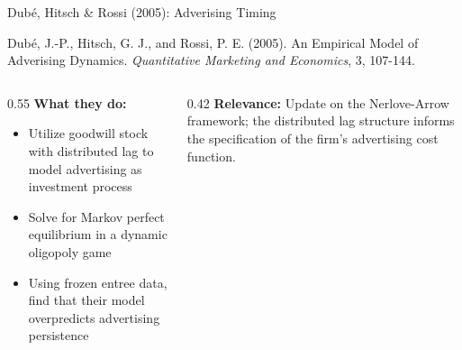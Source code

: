 \documentclass[aspectratio=169,professionalfonts]{beamer}
\newcommand{\hl}[1]{\textbf{\textcolor{UGARed}{#1}}}
\begin{document}
\begin{frame}{Dub\'e, Hitsch \& Rossi (2005): Adverising Timing}
  \begin{tcolorbox}[colback=red!5!white, colframe=UGARed, title=\textbf{Citation}]
    Dub\'e, J.-P., Hitsch, G. J., and Rossi, P. E. (2005).  An Empirical Model of Adverising Dynamics.
    \textit{Quantitative Marketing and Economics}, 3, 107-144.
  \end{tcolorbox}
  \vspace{6pt}
  \begin{columns}[T]
    \begin{column}{0.55\textwidth}
      \hl{What they do:}
      \begin{itemize}
        \item Utilize goodwill stock with distributed lag to model advertising as investment process
        \item Solve for Markov perfect equilibrium in a dynamic oligopoly game
        \item Using frozen entree data, find that their model overpredicts advertising persistence
      \end{itemize}
    \end{column}
    \begin{column}{0.42\textwidth}
      \hl{Relevance:} Update on the Nerlove-Arrow framework; the distributed lag structure informs the specification of the firm's advertising cost function. 
    \end{column}
  \end{columns}
\end{frame}
\end{document}
